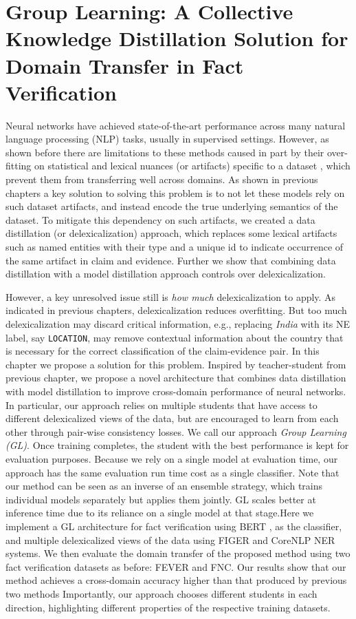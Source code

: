 \chapter{Group Learning: A Collective Knowledge Distillation Solution for Domain Transfer in Fact Verification \label{chapter:emnlp2021}}


Neural networks have achieved state-of-the-art performance across many natural language processing (NLP) tasks, usually in supervised settings.
However, as shown before there are limitations to these 
methods caused in part by their over-fitting on statistical and lexical nuances (or artifacts) specific to a dataset \citep{gururangan-etal-2018-annotation}, which
prevent them from transferring well across domains. As shown in previous chapters a key solution to solving this problem is to not let these models rely on such dataset artifacts, and instead encode the true underlying semantics of the dataset. To mitigate this dependency on such artifacts, we created a data distillation (or delexicalization) approach, which replaces some lexical artifacts such as named entities with their type and a unique id to indicate occurrence of the same artifact in claim and evidence. Further we show that combining data distillation with a model distillation approach controls over delexicalization. 

However, a key unresolved issue still is {\em how much} delexicalization to apply. As indicated in previous chapters, delexicalization reduces overfitting. But too much delexicalization may discard critical information, e.g., replacing {\em India} with its NE label, say {\tt LOCATION}, may remove contextual information about the country that is necessary for the correct classification of the claim-evidence pair. In this chapter we propose a solution for this problem. Inspired by teacher-student from previous chapter, we propose a novel architecture that combines data distillation with model distillation to improve cross-domain performance of neural networks. In particular, our approach relies on multiple students that have access to different delexicalized views of the data, but are encouraged to learn from each other through pair-wise consistency losses. We call our approach \emph{Group Learning (GL)}. Once training completes, the student with the best performance is kept for evaluation purposes. Because we rely on a single model at evaluation time, our approach has the same evaluation run time cost as a single classifier. Note that our method can be seen as an inverse of an ensemble strategy, which trains individual models separately but applies them jointly. GL scales better at inference time due to its reliance on a single model at that stage.Here  we implement a GL architecture for fact verification using 
BERT \citep{devlin-etal-2019-bert}, as the classifier, and multiple delexicalized views of the data using FIGER and CoreNLP NER systems. We then evaluate the domain transfer of the proposed method using two fact verification datasets as before: FEVER and FNC. Our results show that our method achieves a cross-domain accuracy higher than that produced by previous two methods  Importantly, our approach chooses different students in each direction, highlighting different properties of the respective training datasets.


